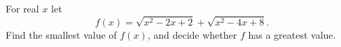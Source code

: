 For real $x$ let
\[
f(x)=\sqrt{x^2-2x+2}+\sqrt{x^2-4x+8}.
\]
Find the smallest value of $f(x)$, and decide whether $f$ has a greatest value.
